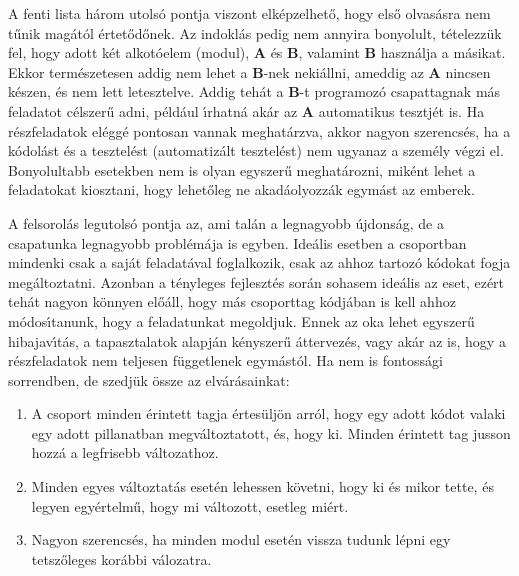 A fenti lista h\'arom utols\'o pontja viszont elk\'epzelhet\H{o}, hogy els\H{o} olvas\'asra nem 
t\H{u}nik mag\'at\'ol \'ertet\H{o}d\H{o}nek. Az indokl\'as pedig nem annyira bonyolult, t\'etelezz\"uk 
fel, hogy adott k\'et alkot\'oelem (modul), {\bf A} \'es {\bf B}, valamint {\bf B} hasz\-n\'al\-ja 
a m\'asikat. Ekkor term\'eszetesen addig nem lehet a {\bf B}-nek neki\'allni, ameddig az {\bf A} 
nincsen k\'eszen, \'es nem lett letesztelve. Addig teh\'at a {\bf B}-t programoz\'o csapattagnak 
m\'as feladatot c\'elszer\H{u} adni, p\'eld\'aul \'{\i}rhatn\'a ak\'ar az {\bf A} automatikus 
tesztj\'et is. Ha r\'eszfeladatok el\'egg\'e pontosan vannak meghat\'arzva, akkor nagyon szerencs\'es, 
ha a k\'odol\'ast \'es a tesztel\'est (automatiz\'alt tesztel\'est) nem ugyanaz a szem\'ely v\'egzi 
el. Bonyolultabb esetekben nem is olyan egyszer\H{u} meghat\'arozni, mik\'ent lehet a feladatokat 
kiosztani, hogy lehet\H{o}leg ne akad\'aolyozz\'ak egym\'ast az emberek.

A felsorol\'as legutols\'o pontja az, ami tal\'an a legnagyobb \'ujdons\'ag, de a csapatunka 
legnagyobb probl\'em\'aja is egyben. Ide\'alis esetben a csoportban mindenki csak a saj\'at 
feladat\'aval foglalkozik, csak az ahhoz tartoz\'o k\'odokat fogja meg\'altoztatni. Azonban a 
t\'enyleges fejleszt\'es sor\'an sohasem ide\'alis az eset, ez\'ert teh\'at nagyon k\"onnyen 
el\H{o}\'all, hogy m\'as csoporttag k\'odj\'aban is kell ahhoz m\'odos\'{\i}tanunk, hogy a 
feladatunkat megoldjuk. Ennek az oka lehet egyszer\H{u} hibajav\'{\i}t\'as, a tapasztalatok 
alapj\'an k\'enyszer\H{u} \'attervez\'es, vagy ak\'ar az is, hogy a r\'eszfeladatok nem 
teljesen f\"uggetlenek egym\'ast\'ol. Ha nem is fontoss\'agi sorrendben, de szedj\"uk \"ossze 
az elv\'ar\'asainkat: 

\begin{enumerate}
\item{A csoport minden \'erintett tagja \'ertes\"ulj\"on arr\'ol, hogy egy adott k\'odot 
   valaki egy adott pillanatban megv\'altoztatott, \'es, hogy ki. Minden \'erintett tag 
   jusson hozz\'a a legfrisebb v\'altozathoz.}
\item{Minden egyes v\'altoztat\'as eset\'en lehessen k\"ovetni, hogy ki \'es mikor tette, 
   \'es legyen egy\'ertelm\H{u}, hogy mi v\'altozott, esetleg mi\'ert.}
\item{Nagyon szerencs\'es, ha minden modul eset\'en vissza tudunk l\'epni egy tetsz\H{o}leges 
   kor\'abbi v\'alozatra.}
\end{enumerate}

